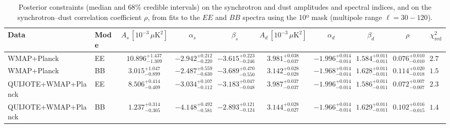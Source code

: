 \begin{table}[h]
\centering
\scriptsize
\setlength{\tabcolsep}{4pt}
\caption{Posterior constraints (median and $68\%$ credible intervals) on the synchrotron and dust amplitudes and spectral indices, and on the synchrotron--dust correlation coefficient $\rho$, from fits to the $EE$ and $BB$ spectra using the 10º mask (multipole range $\ell=30-120$).}
\label{tab:fit_cross_only_ell30-120}
\begin{tabular}{llcccccccc}
\toprule
Data & Mode & $A_s\,[10^{-3}\,\mu\mathrm{K}^2]$ & $\alpha_s$ & $\beta_s$ & $A_d\,[10^{-3}\,\mu\mathrm{K}^2]$ & $\alpha_d$ & $\beta_d$ & $\rho$ & $\chi^2_\mathrm{red}$ \\
\midrule
WMAP+Planck & EE & $10.896^{+1.437}_{-1.309}$ & $-2.942^{+0.212}_{-0.220}$ & $-3.615^{+0.223}_{-0.246}$ & $3.981^{+0.038}_{-0.037}$ & $-1.996^{+0.014}_{-0.014}$ & $1.584^{+0.011}_{-0.011}$ & $0.076^{+0.010}_{-0.010}$ & $2.71$ \\
WMAP+Planck & BB & $3.015^{+1.047}_{-0.899}$ & $-2.487^{+0.559}_{-0.630}$ & $-3.689^{+0.470}_{-0.550}$ & $3.142^{+0.028}_{-0.028}$ & $-1.968^{+0.014}_{-0.014}$ & $1.628^{+0.011}_{-0.011}$ & $0.114^{+0.020}_{-0.018}$ & $1.55$ \\
QUIJOTE+WMAP+Planck & EE & $8.506^{+0.414}_{-0.409}$ & $-3.034^{+0.107}_{-0.112}$ & $-3.183^{+0.047}_{-0.048}$ & $3.987^{+0.037}_{-0.037}$ & $-1.996^{+0.014}_{-0.014}$ & $1.586^{+0.011}_{-0.011}$ & $0.072^{+0.007}_{-0.007}$ & $2.33$ \\
QUIJOTE+WMAP+Planck & BB & $1.237^{+0.314}_{-0.305}$ & $-4.148^{+0.492}_{-0.581}$ & $-2.893^{+0.121}_{-0.124}$ & $3.144^{+0.028}_{-0.027}$ & $-1.966^{+0.014}_{-0.014}$ & $1.629^{+0.011}_{-0.011}$ & $0.102^{+0.016}_{-0.015}$ & $1.46$ \\
\bottomrule
\end{tabular}
\end{table}